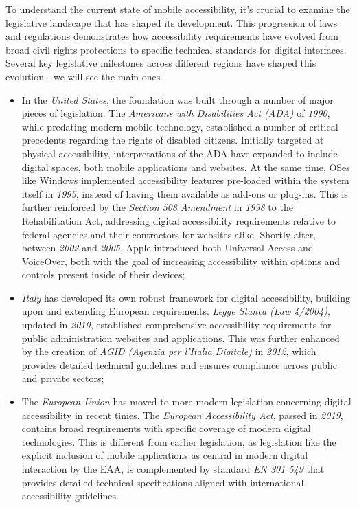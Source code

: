 To understand the current state of mobile accessibility, it's crucial to examine the legislative landscape that has shaped its development. This progression of laws and regulations demonstrates how accessibility requirements have evolved from broad civil rights protections to specific technical standards for digital interfaces. Several key legislative milestones across different regions have shaped this evolution - we will see the main ones 

\begin{itemize}
    \item In the \textit{United States}, the foundation was built through a number of major pieces of legislation. The \textit{Americans with Disabilities Act (ADA)} of \textit{1990}, while predating modern mobile technology, established a number of critical precedents regarding the rights of disabled citizens. Initially targeted at physical accessibility, interpretations of the ADA have expanded to include digital spaces, both mobile applications and websites. At the same time, OSes like Windows implemented accessibility features pre-loaded within the system itself in \textit{1995}, instead of having them available as add-ons or plug-ins. This is further reinforced by the \textit{Section 508 Amendment} in \textit{1998} to the Rehabilitation Act, addressing digital accessibility requirements relative to federal agencies and their contractors for websites alike. Shortly after, between \textit{2002} and \textit{2005}, Apple introduced both Universal Access and VoiceOver, both with the goal of increasing accessibility within options and controls present inside of their devices;
    
    \item \textit{Italy} has developed its own robust framework for digital accessibility, building upon and extending European requirements. \textit{Legge Stanca (Law 4/2004)}, updated in \textit{2010}, established comprehensive accessibility requirements for public administration websites and applications. This was further enhanced by the creation of \textit{AGID (Agenzia per l'Italia Digitale)} in \textit{2012}, which provides detailed technical guidelines and ensures compliance across public and private sectors;
    
    \item The \textit{European Union} has moved to more modern legislation concerning digital accessibility in recent times. The \textit{European Accessibility Act}, passed in \textit{2019}, contains broad requirements with specific coverage of modern digital technologies. This is different from earlier legislation, as legislation like the explicit inclusion of mobile applications as central in modern digital interaction by the EAA, is complemented by standard \textit{EN 301 549} that provides detailed technical specifications aligned with international accessibility guidelines.
\end{itemize}

